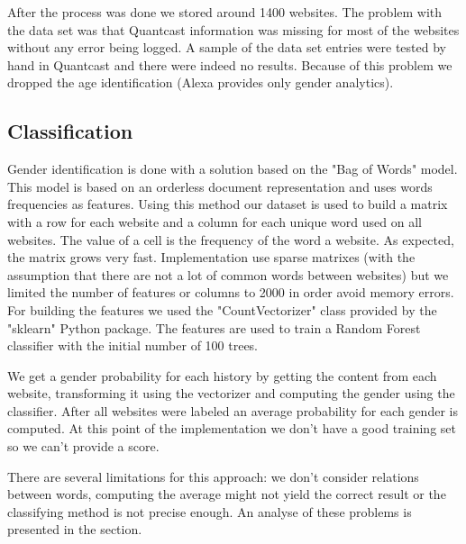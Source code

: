 After the process was done we stored around 1400 websites. The problem with the data set was that Quantcast information was missing for most of the websites without any error being logged. A sample of the data set entries were tested by hand in Quantcast and there were indeed no results. Because of this problem we dropped the age identification (Alexa provides only gender analytics).

\subsection{Classification}

Gender identification is done with a solution based on the "Bag of Words" model. This model is based on an orderless document representation and uses words frequencies as features. Using this method our dataset is used to build a matrix with a row for each website and a column for each unique word used on all websites. The value of a cell is the frequency of the word a website. As expected, the matrix grows very fast. Implementation use sparse matrixes (with the assumption that there are not a lot of common words between websites) but we limited the number of features or columns to 2000 in order avoid memory errors. For building the features we used the "CountVectorizer" class provided by the "sklearn" Python package. The features are used to train a Random Forest classifier with the initial number of 100 trees.

We get a gender probability for each history by getting the content from each website, transforming it using the vectorizer and computing the gender using the classifier. After all websites were labeled an average probability for each gender is computed. At this point of the implementation we don't have a good training set so we can't provide a score.

There are several limitations for this approach: we don't consider relations between words, computing the average might not yield the correct result or the classifying method is not precise enough. An analyse of these problems is presented in the section.